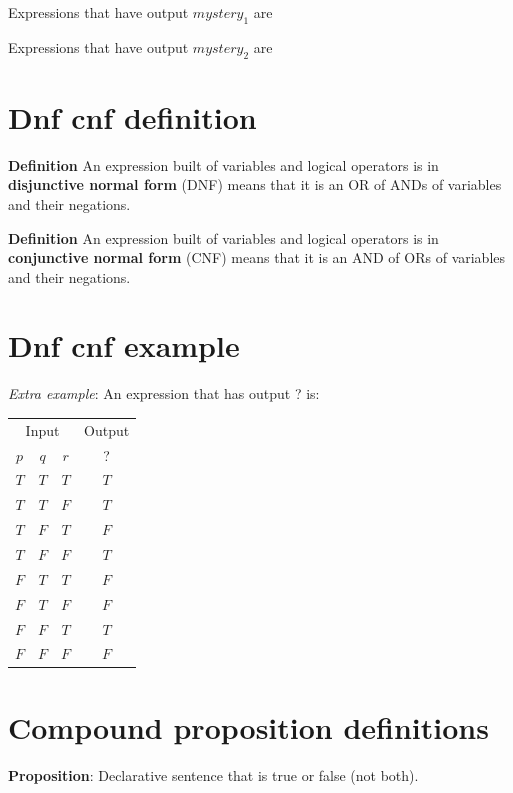 \documentclass[12pt, oneside]{article}
\begin{document}
Expressions that have output $mystery_1$ are

\vspace{100pt}

Expressions that have output $mystery_2$ are

\vspace{100pt}
 \vfill
\section*{Dnf cnf definition}


{\bf  Definition} An expression built of variables and logical 
operators is in {\bf disjunctive normal form}  (DNF) means
that it is an OR of ANDs of variables and their negations.

{\bf  Definition} An expression built of variables and logical 
operators is in {\bf conjunctive normal form}  (CNF) means
that it is an AND of ORs of variables and their negations.
 \vfill
\section*{Dnf cnf example}




{\it Extra example}: An expression that has output ? is: 

\begin{tabular}{ccc||c}
    \multicolumn{3}{c||}{Input}  & Output\\
    $p$ & $q$ & $r$  &  ?\\
    \hline
    $T$ & $T$  & $T$ & $T$ \\
    $T$ & $T$  & $F$ & $T$ \\
    $T$ & $F$  & $T$ & $F$ \\
    $T$ & $F$  & $F$ & $T$ \\
    $F$ & $T$  & $T$ & $F$ \\
    $F$ & $T$  & $F$ & $F$ \\
    $F$ & $F$  & $T$ & $T$ \\
    $F$ & $F$  & $F$ & $F$ \\
\end{tabular}

\vfill

 \vfill
\section*{Compound proposition definitions}


{\bf Proposition}: Declarative sentence that is true or false (not both).
\end{document}

